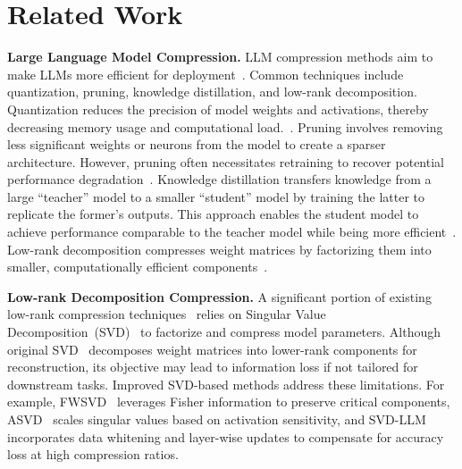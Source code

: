 \section{Related Work}
\noindent \textbf{Large Language Model Compression.}
LLM compression methods aim to make LLMs more efficient for deployment~\cite{wan2023efficient, zhu2023survey}. Common techniques include quantization, pruning, knowledge distillation, and low-rank decomposition. Quantization reduces the precision of model weights and activations, thereby decreasing memory usage and computational load.~\cite{dettmers2022gpt3, kimsqueezellm, shen2024efficient,Lin2023AWQAW}.
Pruning involves removing less significant weights or neurons from the model to create a sparser architecture. However, pruning often necessitates retraining to recover potential performance degradation~\cite{ma2023llm, ashkboos2024slicegpt, zhong2024blockpruner, hsieh2023distilling}. Knowledge distillation transfers knowledge from a large ``teacher'' model to a smaller ``student'' model by training the latter to replicate the former's outputs. This approach enables the student model to achieve performance comparable to the teacher model while being more efficient~\cite{zhong2024revisiting, muralidharan2024compact, hsieh2023distilling}. Low-rank decomposition compresses weight matrices by factorizing them into smaller, computationally efficient components~\cite{Hsu2022FWSVD, yuan2023asvd, wang2024svd}.

\vspace{1mm}
\noindent \textbf{Low-rank Decomposition Compression.}
A significant portion of existing low-rank compression techniques~\cite{li2023losparse, noach2020compressing, chen2023ternary, Hsu2022FWSVD, yuan2023asvd, wang2024svd} relies on Singular Value Decomposition~(SVD)~\cite{stewart1993early, wall2003singular} to factorize and compress model parameters.
Although original SVD~\cite{stewart1993early, wall2003singular} decomposes weight matrices into lower-rank components for reconstruction, its objective may lead to information loss if not tailored for downstream tasks. Improved SVD-based methods address these limitations. For example, FWSVD~\cite{Hsu2022FWSVD} leverages Fisher information to preserve critical components, ASVD~\cite{yuan2023asvd} scales singular values based on activation sensitivity, and SVD-LLM~\cite{wang2024svd} incorporates data whitening and layer-wise updates to compensate for accuracy loss at high compression ratios.

